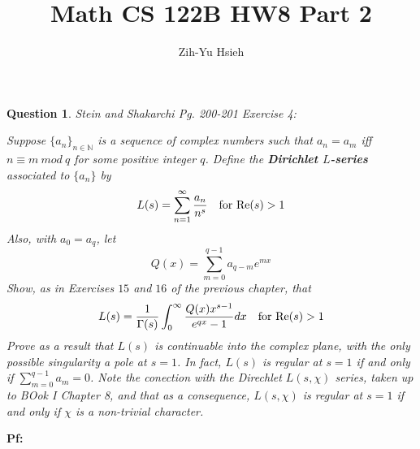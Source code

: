 \documentclass{article}
\title{Math CS 122B HW8 Part 2}
\author{Zih-Yu Hsieh}
\newtheorem{question}{Question}
\begin{document}
\maketitle

\section{}
\begin{question}\label{q:1}
    Stein and Shakarchi Pg. 200-201 Exercise 4:

    Suppose $\{a_n\}_{n\in\mathbb{N}}$ is a sequence of complex numbers such that $a_n=a_m$ iff $n\equiv m\ mod\ q$ for some positive integer $q$. Define the \textbf{Dirichlet $L$-series} associated to $\{a_n\}$ by 
    $$L(s)=\sum_{n=1}^{\infty}\frac{a_n}{n^s}\quad \textmd{for Re}(s)>1$$
    Also, with $a_0=a_q$, let 
    $$Q(x)=\sum_{m=0}^{q-1}a_{q-m}e^{mx}$$
    Show, as in Exercises $15$ and $16$ of the previous chapter, that 
    $$L(s)=\frac{1}{\Gamma(s)}\int_{0}^{\infty}\frac{Q(x)x^{s-1}}{e^{qx}-1}dx\quad \textmd{for Re}(s)>1$$
    Prove as a result that $L(s)$ is continuable into the complex plane, with the only possible singularity a pole at $s=1$. In fact, $L(s)$ is regular at $s=1$ if and only if $\sum_{m=0}^{q-1}a_m=0$. Note the conection with the Direchlet $L(s,\chi)$ series, taken up to BOok I Chapter 8, and that as a consequence, $L(s,\chi)$ is regular at $s=1$ if and only if $\chi$ is a non-trivial character.
\end{question}

\textbf{Pf:}
\end{document}

